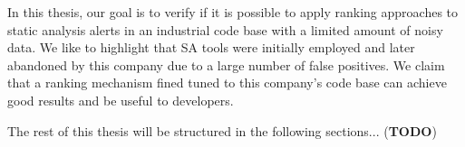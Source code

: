 


In this thesis, our goal is to verify if it is possible to apply ranking approaches to static analysis alerts in an industrial code base with a limited amount of noisy data. We like to highlight that SA tools were initially employed and later abandoned by this company due to a large number of false positives. We claim that a ranking mechanism fined tuned to this company's code base can achieve good results and be useful to developers.



The rest of this thesis will be structured in the following sections... (\textbf{TODO})



